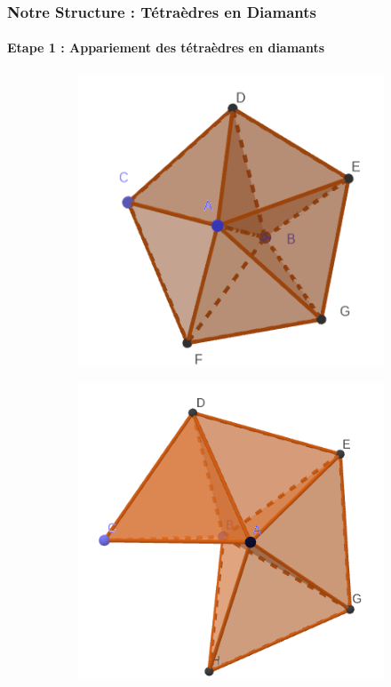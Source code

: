 \documentclass[9pt]{beamer}
\begin{document}
\begin{frame}
\frametitle{Notre Structure : Tétraèdres en Diamants}
\framesubtitle{Etape 1 : Appariement des tétraèdres en diamants}
\begin{figure}[H]
\centering
\begin{subfigure}{.24\textwidth}
  \centering
  \includegraphics[scale=0.25]{Images/full_diamond}
  \caption{}
\end{subfigure}%
\begin{subfigure}{.24\textwidth}
  \centering
  \includegraphics[scale=0.21]{Images/not_full_diamond}
  \caption{}
\end{subfigure}
\begin{subfigure}{.24\textwidth}
  \centering

\end{subfigure}
\end{figure}
\end{frame}
\end{document}
